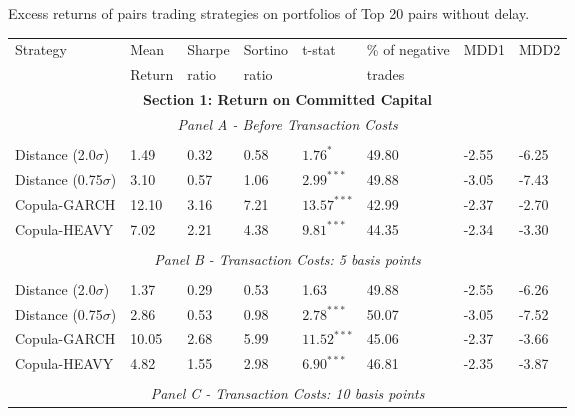 \documentclass[a4paper,12pt]{report}
\begin{document}
\begin{threeparttable}[H]
	\centering \scriptsize
	\caption{Excess returns of pairs trading strategies on portfolios of Top 20 pairs without delay. }
	\begin{tabularx}{\textwidth}{@{\extracolsep{\fill}}llllllll@{}}
		\toprule
		Strategy & Mean  & Sharpe & Sortino & t-stat & \% of negative   & MDD1 & MDD2 \\
		& Return & ratio &  ratio     &  &  trades     &       &  \\
		\midrule
		\multicolumn{8}{c}{\textbf{Section 1: Return on Committed Capital}} \\
		\multicolumn{8}{c}{\textit{Panel A - Before Transaction Costs}} \\
		&       &       &       &       &       &       &  \\
		Distance (2.0$\sigma$) & 1.49 & 0.32 & 0.58 & $1.76^{*}$ & 49.80 & -2.55 & -6.25 \\
		Distance (0.75$\sigma$) & 3.10 & 0.57 & 1.06 & $2.99^{***}$ & 49.88 & -3.05 & -7.43 \\
		Copula-GARCH & 12.10 & 3.16 & 7.21 & $13.57^{***}$ & 42.99 & -2.37 & -2.70 \\
		Copula-HEAVY & 7.02 & 2.21 & 4.38 & $9.81^{***}$ & 44.35 & -2.34 & -3.30 \\
		\multicolumn{1}{r}{} & \multicolumn{1}{r}{} & \multicolumn{1}{r}{} & \multicolumn{1}{r}{} & \multicolumn{1}{r}{} & \multicolumn{1}{r}{} & \multicolumn{1}{r}{} & \multicolumn{1}{r}{} \\
		\multicolumn{8}{c}{\textit{Panel B - Transaction Costs: 5 basis points}} \\
		&       &       &       &       &       &       &  \\
		Distance (2.0$\sigma$) & 1.37  & 0.29  & 0.53  & 1.63  & 49.88 & -2.55  & -6.26 \\
		Distance (0.75$\sigma$) & 2.86  & 0.53  & 0.98  & $2.78^{***}$  & 50.07 & -3.05  & -7.52 \\
		Copula-GARCH & 10.05 & 2.68  & 5.99  & $11.52^{***}$ & 45.06 & -2.37  & -3.66 \\
		Copula-HEAVY & 4.82  & 1.55  & 2.98  & $6.90^{***}$  & 46.81 & -2.35  & -3.87 \\
		\multicolumn{1}{r}{} & \multicolumn{1}{r}{} & \multicolumn{1}{r}{} & \multicolumn{1}{r}{} & \multicolumn{1}{r}{} & \multicolumn{1}{r}{} & \multicolumn{1}{r}{} & \multicolumn{1}{r}{} \\
		\multicolumn{8}{c}{\textit{Panel C - Transaction Costs: 10 basis points}} \\

\end{tabularx}
\end{threeparttable}
\end{document}
